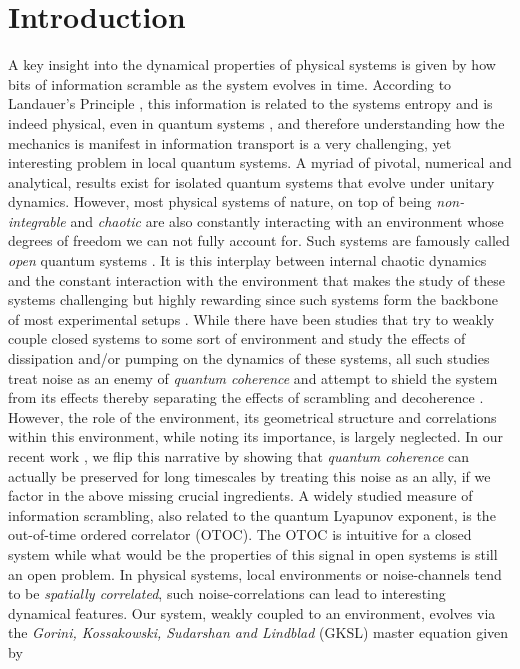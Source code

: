 \documentclass[aps,pra,reprint,amsmath,amssymb]{revtex4-2}
\begin{document}
\section{Introduction}
A key insight into the dynamical properties of physical systems is given by how bits of information scramble as the system evolves in time. According to Landauer's Principle \cite{landauer1961irreversibility}, this information is related to the systems entropy and is indeed physical, even in quantum systems \cite{peterson2016experimental}, and therefore understanding how the mechanics is manifest in information transport is a very challenging, yet interesting problem in local quantum systems. A myriad of pivotal, numerical and analytical, results exist for isolated quantum systems that evolve under unitary dynamics. However, most physical systems of nature, on top of being {\it non-integrable} and {\it chaotic} are also constantly interacting with an environment whose degrees of freedom we can not fully account for. Such systems are famously called {\it open} quantum systems \cite{breuer2002theory}. It is this interplay between internal chaotic dynamics and the constant interaction with the environment that makes the study of these systems challenging but highly rewarding since such systems form the backbone of most experimental setups \cite{bergamasco2023quantum}. While there have been studies that try to weakly couple closed systems to some sort of environment and study the effects of dissipation and/or pumping on the dynamics of these systems, all such studies treat noise as an enemy of \textit{quantum coherence} and attempt to shield the system from its effects thereby separating the effects of scrambling and decoherence \cite{zhang2019information}. However, the role of the environment, its geometrical structure and correlations within this environment, while noting its importance, is largely neglected. In our recent work \cite{Tyagi:2024aa,Bittner2024,bittner2025statistical}, we flip this narrative by showing that {\it quantum coherence} can actually be preserved for long timescales by treating this noise as an ally, if we factor in the above missing crucial ingredients. A widely studied measure of information scrambling, also related to the quantum Lyapunov exponent, is the out-of-time ordered correlator (OTOC)\cite{xu2024scrambling}. The OTOC is intuitive for a closed system while what would be the properties of this signal in open systems is still an open problem. In physical systems, local environments or noise-channels tend to be {\it spatially correlated}, such noise-correlations can lead to interesting dynamical features.  Our system, weakly coupled to an environment,  evolves via the {\it Gorini, Kossakowski, Sudarshan and Lindblad} (GKSL) master equation given by 
\end{document}

